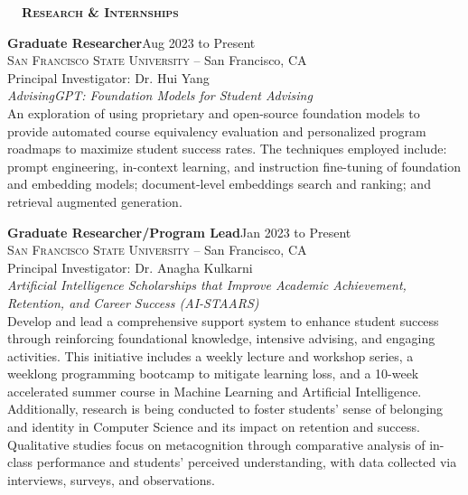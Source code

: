 \documentclass[hidelinks, 10pt]{article}
\def\contentblockspacing{2.5mm}     %
\def\sectionspacing{5mm}            %
\def\sectiontocontentspacing{4mm}   %
\renewcommand{\section}[1]{
    {\fontsize{14}{14}\selectfont \textsc{\textbf{\ \ #1\ \ }}}\hrulefill
}
\begin{document}
\vspace{\sectionspacing}


\section{Research \& Internships}

\vspace{\sectiontocontentspacing}

\begin{minipage}[ct]{0.9\linewidth}
    \textbf{Graduate Researcher}\hfill Aug 2023 to Present\\
    \textsc{San Francisco State University} -- San Francisco, CA\\
    Principal Investigator: Dr. Hui Yang\vspace{1mm}\\
    {\textit{AdvisingGPT: Foundation Models for Student Advising}}\\
    An exploration of using proprietary and open-source foundation models to provide automated course equivalency evaluation and
    personalized program roadmaps to maximize student success rates. The techniques employed include: prompt engineering, in-context
    learning, and instruction fine-tuning of foundation and embedding models; document-level embeddings search and ranking; and
    retrieval augmented generation.
\end{minipage}

\vspace{\contentblockspacing}

\begin{minipage}[ct]{0.9\linewidth}
    \textbf{Graduate Researcher/Program Lead}\hfill Jan 2023 to Present\\
    \textsc{San Francisco State University} -- San Francisco, CA\\
    Principal Investigator: Dr. Anagha Kulkarni\vspace{1mm}\\
    {\textit{Artificial Intelligence Scholarships that Improve Academic Achievement, Retention, and Career Success (AI-STAARS)}}\\
    Develop and lead a comprehensive support system to enhance student success through reinforcing foundational knowledge, intensive
    advising, and engaging activities. This initiative includes a weekly lecture and workshop series, a weeklong programming bootcamp to
    mitigate learning loss, and a 10-week accelerated summer course in Machine Learning and Artificial Intelligence. Additionally, research
    is being conducted to foster students' sense of belonging and identity in Computer Science and its impact on retention and success.
    Qualitative studies focus on metacognition through comparative analysis of in-class performance and students' perceived understanding, 
    with data collected via interviews, surveys, and observations.
\end{minipage}
\end{document}
